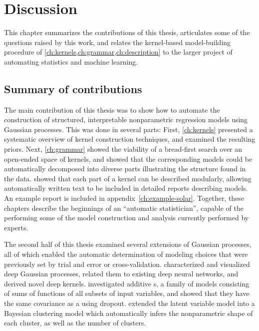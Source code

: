 
\inbpdocument

\chapter{Discussion}
\label{ch:discussion}

This chapter summarizes the contributions of this thesis, articulates some of the questions raised by this work, and relates the kernel-based model-building procedure of \cref{ch:kernels,ch:grammar,ch:description} to the larger project of automating statistics and machine learning.


\section{Summary of contributions}

The main contribution of this thesis was to show how to automate the construction of structured, interpretable nonparametric regression models using Gaussian processes.
This was done in several parts:
First, \cref{ch:kernels} presented a systematic overview of kernel construction techniques, and examined the resulting \gp{} priors.
Next, \cref{ch:grammar} showed the viability of a bread-first search over an open-ended space of kernels, and showed that the corresponding \gp{} models could be automatically decomposed into diverse parts illustrating the structure found in the data.
 showed that each part of a kernel can be described modularly, allowing automatically written text to be included in detailed reports describing \gp{} models.
An example report is included in appendix~\ref{ch:example-solar}.
Together, these chapters describe the beginnings of an ``automatic statistician'', capable of the performing some of the model construction and analysis currently performed by experts.

The second half of this thesis examined several extensions of Gaussian processes, all of which enabled the automatic determination of modeling choices that were previously set by trial and error or cross-validation.
 characterized and visualized deep Gaussian processes, related them to existing deep neural networks, and derived novel deep kernels.
 investigated additive \gp{}s, a family of models consisting of sums of functions of all subsets of input variables, and showed that they have the same covariance as a \gp{} using dropout.
 extended the \gp{} latent variable model into a Bayesian clustering model which automatically infers the nonparametric shape of each cluster, as well as the number of clusters.

